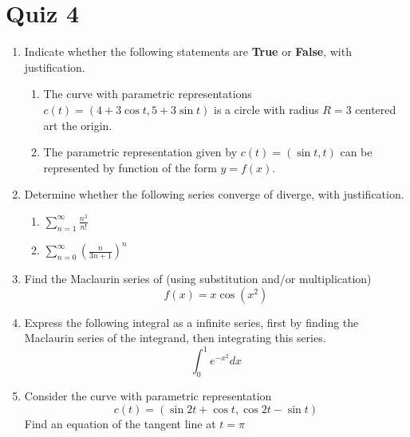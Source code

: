 \section{Quiz 4}
\begin{enumerate}
  \item Indicate whether the following statements are \textbf{True} or
    \textbf{False}, with justification.

  \begin{enumerate}[itemsep=22em]
    \item The curve with parametric representations \(c(t) = (4+3\cos t, 5 + 3
      \sin t)\) is a circle with radius \(R= 3\) centered art the origin.

    \item The parametric representation given by \(c(t) = (\sin t, t)\) can be
      represented by function of the form \(y=f(x)\).
  \end{enumerate}

\newpage %
  \item Determine whether the following series converge of diverge, with
    justification.
    \begin{enumerate}[itemsep=22em]
      \item \(\displaystyle \sum_{n=1}^{\infty} \frac{n^3}{n!} \)

      \item \(\displaystyle \sum_{n=0}^{\infty} \left( \frac{n}{3n+1} \right)^n  \)
    \end{enumerate}

\newpage %

  \item Find the Maclaurin series of (using substitution and/or multiplication)
    \[f(x) = x \cos (x^2)\]

\newpage %

  \item Express the following integral as a infinite series, first by finding the
    Maclaurin series of the integrand, then integrating this series.
    \[%
    \int_{0}^{1} e^{-x^2}  dx
    \]%

\newpage %

  \item Consider the curve with parametric representation \[c(t) = (\sin 2t +
    \cos t, \cos 2t - \sin t)\]
    Find an equation of the tangent line at \(t=\pi\)

\end{enumerate}
